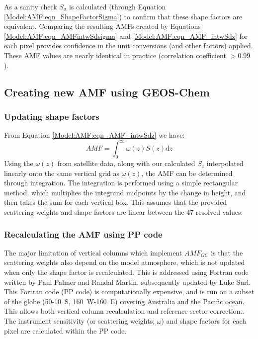     As a sanity check $S_\sigma$ is calculated (through Equation \ref{Model:AMF:eqn_ShapeFactorSigma}) to confirm that these shape factors are equivalent.
    Comparing the resulting AMFs created by Equations \ref{Model:AMF:eqn_AMFintwSdsigma} and \ref{Model:AMF:eqn_AMF_intwSdz} for each pixel provides confidence in the unit conversions (and other factors) applied.
    These AMF values are nearly identical in practice (correlation coefficient $> 0.99$).
    
  \subsection{Creating new AMF using GEOS-Chem}
    \label{Model:omiRecalc:AMF}
    
    \subsubsection{Updating shape factors}
    
      From Equation \ref{Model:AMF:eqn_AMF_intwSdz} we have:
      $$ AMF = \int_0^\infty \omega(z) S(z) \mathrm{d}z $$
      Using the $\omega(z)$ from satellite data, along with our calculated $S_z$ interpolated linearly onto the same vertical grid as $\omega(z)$, the AMF can be determined through integration.
      The integration is performed using a simple rectangular method, which multiplies the integrand midpoints by the change in height, and then takes the sum for each vertical box.
      This assumes that the provided scattering weights and shape factors are linear between the 47 resolved values.
    
    \subsubsection{Recalculating the AMF using PP code}
      \label{Model:omiRecalc:ppcode}
      
      
      The major limitation of vertical columns which implement $AMF_{GC}$ is that the scattering weights also depend on the model atmosphere, which is not updated when only the shape factor is recalculated.
      This is addressed using Fortran code written by Paul Palmer and Randal Martin, subsequently updated by Luke Surl.
      This Fortran code (PP code) is computationally expensive, and is run on a subset of the globe (50-10\degr~S, 160\degr~W-160\degr~E) covering Australia and the Pacific ocean.
      This allows both vertical column recalculation and reference sector correction..
      The instrument sensitivity (or scattering weights; $\omega$) and shape factors for each pixel are calculated within the PP code.
      
